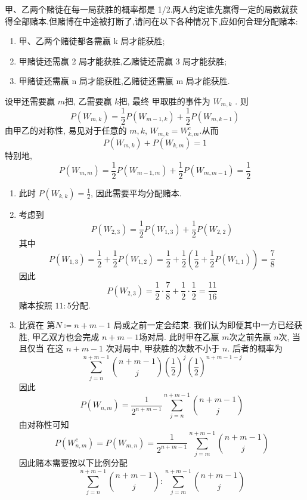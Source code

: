 \documentclass[../main.tex]{subfiles}
\begin{document}
\begin{exercise}{}{}
甲、乙两个赌徒在每一局获胜的概率都是 1/2.两人约定谁先赢得一定的局数就获得全部赌本.但赌博在中途被打断了,请问在以下各种情况下,应如何合理分配赌本:
\begin{enumerate}
\item[(1)] 甲、乙两个赌徒都各需赢 k 局才能获胜;
\item[(2)] 甲赌徒还需赢 2 局才能获胜,乙赌徒还需赢 3 局才能获胜;
\item[(3)] 甲赌徒还需赢 n 局才能获胜,乙赌徒还需赢 m 局才能获胜.
\end{enumerate}
\end{exercise}
\begin{solution}
    设甲还需要赢 \(  m  \)把, 乙需要赢 \(  k  \)把, 最终 甲取胜的事件为 \(  W_{m,k}  \)    . 则 \[
        P\left( W_{m,k} \right)= \frac{1 }{2 }P\left( W_{m-1,k} \right)+ \frac{1 }{2 }P\left( W_{m,k-1} \right)     
        \]由甲乙的对称性, 易见对于任意的 \(  m,k  \), \(  W_{m,k}=W_{k,m}^{c}\).从而 \[
        P\left( W_{m,k} \right)+ P\left( W_{k,m} \right)= 1  
        \] 特别地,  \[
        P\left( W_{m,m} \right)= \frac{1 }{2 }P\left( W_{m-1,m} \right)+ \frac{1 }{2 }P\left( W_{m,m-1} \right)=   \frac{1 }{2 }    
        \]  
    \begin{enumerate}
        \item[(1)] 此时 \(  P\left( W_{k,k} \right)= \frac{1 }{2 }    \), 因此需要平均分配赌本.
        \item[(2)] 考虑到 \[
        P\left( W_{2,3} \right)= \frac{1 }{2 }P\left( W_{1,3} \right)+ \frac{1 }{2 }P\left( W_{2,2} \right)     
        \] 其中 \[
        P\left( W_{1,3} \right)= \frac{1 }{2 }+ \frac{1 }{2 }P\left( W_{1,2} \right)= \frac{1 }{2 }+ \frac{1 }{2 }\left( \frac{1 }{2 }+ \frac{1 }{2 }P\left( W_{1,1} \right)    \right)=        \frac{7 }{8 } 
        \]因此 \[
        P\left( W_{2,3} \right)= \frac{1 }{2 }\cdot \frac{7 }{8 }+ \frac{1 }{2 }\cdot \frac{1 }{2 }= \frac{11 }{16 }      
        \]赌本按照 \(  11:5  \)分配. 
        \item[(3)] 比赛在 第\(  N\coloneqq n+ m-1  \) 局或之前一定会结束. 我们认为即便其中一方已经获胜, 甲乙双方也会完成 \(  n+ m-1  \)场对局. 此时甲在乙赢 \(  m  \)次之前先赢 \(  n  \)次, 当且仅当   在这 \(  n+ m-1  \) 次对局中, 甲获胜的次数不小于 \(  n  \). 后者的概率为 \[
        \sum _{j= n}^{n+ m-1}\binom{n+ m-1  }{  j}\left( \frac{1 }{2 }  \right)^{j}\left( \frac{1 }{2 }  \right)^{n+ m-1-j}   
        \]因此 \[
        P\left( W_{n,m} \right)= \frac{1 }{2^{n+ m-1} }\sum _{j= n}^{n+ m-1}\binom{ n+ m-1 }{j  }   
        \]由对称性可知 \[
        P\left( W_{n,m}^{c} \right)= P\left( W_{m,n} \right)= \frac{1 }{2^{n+ m-1} }\sum _{j= m}^{n+ m-1}\binom{ n+ m-1 }{j  }    
        \]因此赌本需要按以下比例分配 \[
      \sum _{j= n}^{n+ m-1}\binom{ n+ m-1 }{j  }   : \sum _{j= m}^{n+ m-1}\binom{ n+ m-1 }{j  }    
        \]
    \end{enumerate}
    
\end{solution}
\end{document}
